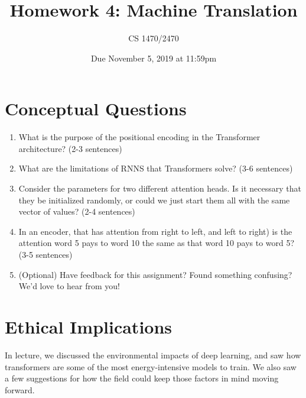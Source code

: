 \documentclass{article}
\title{Homework 4: Machine Translation}
\date{Due November 5, 2019 at 11:59pm}
\author{CS 1470/2470}
\begin{document}
\maketitle

\section{Conceptual Questions}
\begin{enumerate}

\item What is the purpose of the positional encoding in the Transformer architecture? (2-3 sentences)

\item What are the limitations of RNNS that Transformers solve? (3-6 sentences)

\item Consider the parameters for two different attention heads.  Is it necessary that they be initialized randomly, or could we just start them all with the same vector of values? (2-4 sentences)

\item  In an encoder, that has attention from right to left, and left to right) is the attention word 5 pays to word 10 the same as that word 10 pays to word 5? (3-5 sentences)

\item (Optional) Have feedback for this assignment? Found something confusing? We'd love to hear from you!

\end{enumerate}


\section{Ethical Implications}

In lecture, we discussed the environmental impacts of deep learning, and saw how transformers are some of the most energy-intensive models to train. We also saw a few suggestions for how the field could keep those factors in mind moving forward.
\end{document}
